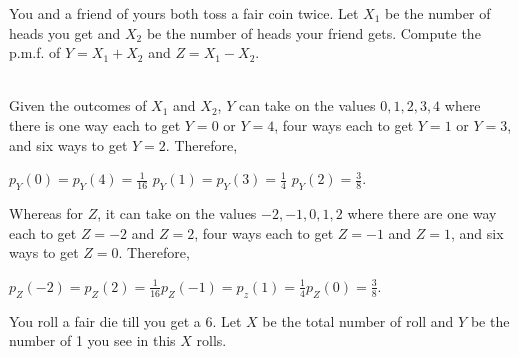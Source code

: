 \documentclass[letterpaper,12pt,addpoints]{exam}
\renewcommand{\Pr}{\mathbb{P}}
\begin{document}
\begin{questions}
You and a friend of yours both toss a fair coin twice. Let $X_1$ be the number 
of heads you get and $X_2$ be the number of heads your friend gets.
Compute the p.m.f. of $Y=X_1+X_2$ and $Z=X_1-X_2$.
\begin{solution}\\
Given the outcomes of $X_1$ and $X_2$, $Y$ can take on the values $0, 1, 2, 3, 4$ where there is one way each to get $Y=0$ or $Y=4$, four ways each to get $Y=1$ or $Y=3$, and six ways to get $Y=2$. Therefore,
\begin{center}
    $p_Y(0)=p_Y(4)=\frac{1}{16}$\hspace{1cm} $p_Y(1)=p_Y(3)=\frac{1}{4}$\hspace{1cm} $p_Y(2)=\frac{3}{8}$.
\end{center}
Whereas for $Z$, it can take on the values $-2, -1, 0, 1, 2$ where there are one way each to get $Z=-2$ and $Z=2$, four ways each to get $Z=-1$ and $Z=1$, and six ways to get $Z=0$. Therefore,
\begin{center}
    $p_Z(-2)=p_Z(2)=\frac{1}{16}$\hspace{1cm}$p_Z(-1)=p_z(1)=\frac{1}{4}$\hspace{1cm}$p_Z(0)=\frac{3}{8}$.
\end{center}
\end{solution}
\vspace*{\fill}\eject

\question

You roll a fair die till you get a 6. Let $X$ be the total number of roll and 
$Y$ be the number of 1 you see in this $X$ rolls. 

\end{questions}
\end{document}
